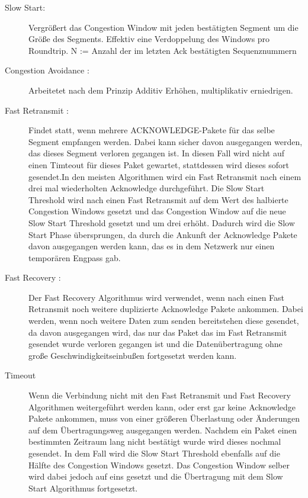 \begin{description}
\item[Slow Start: ] Vergrößert das Congestion Window mit jeden bestätigten Segment um die Größe des Segments. Effektiv eine Verdoppelung des Windows pro Roundtrip.
N := Anzahl der im letzten Ack bestätigten Sequenznummern
\item[Congestion Avoidance :] Arbeitetet nach dem Prinzip Additiv Erhöhen, multiplikativ erniedrigen. 
\item[Fast Retransmit :] Findet statt, wenn mehrere ACKNOWLEDGE-Pakete für das selbe Segment empfangen werden. Dabei kann sicher davon ausgegangen werden, das dieses Segment verloren gegangen ist. In diesen Fall wird nicht auf einen Timteout für dieses Paket gewartet, stattdessen wird dieses sofort gesendet.In den meisten Algorithmen wird ein Fast Retransmit nach einem drei mal wiederholten Acknowledge durchgeführt. Die Slow Start Threshold wird nach einen Fast Retransmit auf dem Wert des halbierte Congestion Windows gesetzt und das Congestion Window auf die neue Slow Start Threshold gesetzt und um drei erhöht. Dadurch wird die Slow Start Phase übersprungen, da durch die Ankunft der Acknowledge Pakete davon ausgegangen werden kann, das es in dem Netzwerk nur einen temporären Engpass gab. 
\item[Fast Recovery :] Der Fast Recovery Algorithmus wird verwendet, wenn nach einen Fast Retransmit noch weitere duplizierte Acknowledge Pakete ankommen. Dabei werden, wenn noch weitere Daten zum senden bereitstehen diese gesendet, da davon ausgegangen wird, das nur das Paket das im Fast Retransmit gesendet wurde verloren gegangen ist und die Datenübertragung ohne große Geschwindigkeitseinbußen fortgesetzt werden kann. 

\item[Timeout] Wenn die Verbindung nicht mit den Fast Retransmit und Fast Recovery Algorithmen weitergeführt werden kann, oder erst gar keine Acknowledge Pakete ankommen, muss von einer größeren Überlastung oder Änderungen auf dem Übertragungsweg ausgegangen werden. Nachdem ein Paket einen bestimmten Zeitraum lang nicht bestätigt wurde wird dieses nochmal gesendet. In dem Fall wird die Slow Start Threshold ebenfalls auf die Hälfte des Congestion Windows gesetzt. Das Congestion Window selber wird dabei jedoch auf eins gesetzt und die Übertragung mit dem Slow Start Algorithmus fortgesetzt. 
\end{description}

